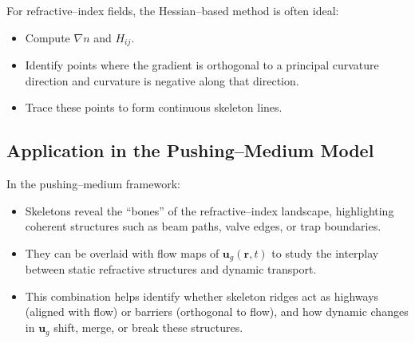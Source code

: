 For refractive--index fields, the Hessian--based method is often ideal:
\begin{itemize}
    \item Compute $\nabla n$ and $H_{ij}$.
    \item Identify points where the gradient is orthogonal to a principal curvature direction and curvature is negative along that direction.
    \item Trace these points to form continuous skeleton lines.
\end{itemize}

\subsection*{Application in the Pushing--Medium Model}
In the pushing--medium framework:
\begin{itemize}
    \item Skeletons reveal the ``bones'' of the refractive--index landscape, highlighting coherent structures such as beam paths, valve edges, or trap boundaries.
    \item They can be overlaid with flow maps of $\mathbf{u}_g(\mathbf{r},t)$ to study the interplay between static refractive structures and dynamic transport.
    \item This combination helps identify whether skeleton ridges act as highways (aligned with flow) or barriers (orthogonal to flow), and how dynamic changes in $\mathbf{u}_g$ shift, merge, or break these structures.
\end{itemize}

